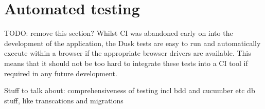 \section{Automated testing}
TODO: remove this section?
Whilst CI was abandoned early on into the development of the application, the Dusk tests are easy to run and automatically execute within a browser if the appropriate browser drivers are available. This means that it should not be too hard to integrate these tests into a CI tool if required in any future development.


Stuff to talk about:
comprehensiveness of testing incl bdd and cucumber etc
db stuff, like transcations and migrations
